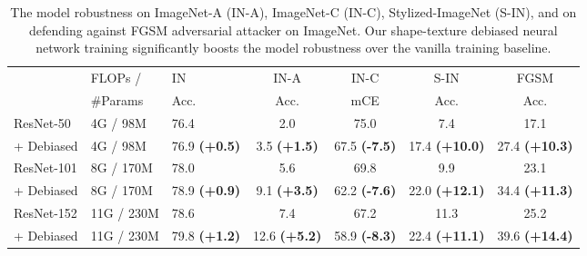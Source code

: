 \documentclass{article} \usepackage{iclr2021_conference,times}
\begin{document}
\begin{table}[t]
\renewcommand\arraystretch{0.8}
\small
\centering
\begin{tabular}{l|HHcccc}
\toprule
& FLOPs / & \scshape{IN} & \scshape{IN-A} & \scshape{IN-C} & \scshape{S-IN} & \scshape{FGSM} \\ 
& \#Params & {\footnotesize Acc. \color{red}} & {\footnotesize Acc. \color{red}} & {\footnotesize mCE \color{red}} & {\footnotesize Acc. \color{red}} & {\footnotesize Acc. \color{red}} \\
\midrule
ResNet-50     &  4G / 98M &    76.4 & 2.0      &   75.0         &      7.4             &   17.1   \\

+ Debiased       & 4G / 98M &  76.9 {\footnotesize \color{Highlight} \textbf{(+0.5)}} &   3.5 {\footnotesize \color{Highlight} \textbf{(+1.5)}}     &    67.5 {\footnotesize \color{Highlight} \textbf{(-7.5)}}        &       17.4 {\footnotesize \color{Highlight} \textbf{(+10.0)}}            &   27.4 {\footnotesize \color{Highlight} \textbf{(+10.3)}}   \\
\midrule
ResNet-101      & 8G / 170M &   78.0 &    5.6    &       69.8     &           9.9        &   23.1   \\
+ Debiased          &   8G / 170M & 78.9 {\footnotesize \color{Highlight} \textbf{(+0.9)}} &    9.1 {\footnotesize \color{Highlight} \textbf{(+3.5)}}    &       62.2 {\footnotesize \color{Highlight} \textbf{(-7.6)}}     &            22.0 {\footnotesize \color{Highlight} \textbf{(+12.1)}}       &   34.4 {\footnotesize \color{Highlight} \textbf{(+11.3)}}   \\ \midrule
ResNet-152      &  11G / 230M &  78.6 & 7.4        &   67.2         &       11.3            &   25.2   \\
+ Debiased   &  11G / 230M &  79.8 {\footnotesize \color{Highlight} \textbf{(+1.2)}} & 12.6 {\footnotesize \color{Highlight} \textbf{(+5.2)}}        &   58.9 {\footnotesize \color{Highlight} \textbf{(-8.3)}}         &      22.4 {\footnotesize \color{Highlight} \textbf{(+11.1)}}             &   39.6 {\footnotesize \color{Highlight} \textbf{(+14.4)}}   \\
\bottomrule
\end{tabular}
\vspace{-0.9em}
\caption{The model robustness on ImageNet-A (IN-A), ImageNet-C (IN-C), Stylized-ImageNet (S-IN), and on defending against FGSM adversarial attacker on ImageNet. Our shape-texture debiased neural network training significantly boosts the model robustness over the vanilla training baseline.}
\label{tab:imagenet_robustness}
\vspace{-1.6em}
\end{table}
\end{document}
